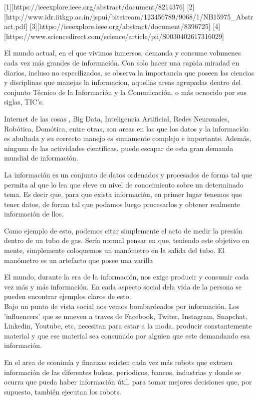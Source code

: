 [1][https://ieeexplore.ieee.org/abstract/document/8214376]
[2][http://www.idr.iitkgp.ac.in/jspui/bitstream/123456789/9068/1/NB15975_Abstract.pdf]
[3][https://ieeexplore.ieee.org/abstract/document/8396725]
[4][https://www.sciencedirect.com/science/article/pii/S0030402617316029]




El mundo actual, en el que vivimos inmersos, demanda y consume volumenes cada vez más grandes de información. Con solo hacer una rapida miradad en diarios, incluso no especilizados, se observa la importancia que poseen las ciencias y disciplinas que manejas la informacion, aquellas areas agrupadas dentro del conjunto Técnico de la Información y la Comunicación, o más ocnocido por sus siglas, TIC's.

Internet de las cosas , Big Data, Inteligencia Artificial, Redes Neuronales, Robótica, Domótica, entre otras, son areas en las que los datos y la información es abultada y su correcto manejo es sumamente complejo e importante. Además, ninguna de las actividades científicas, puede escapar de esta gran demanda mundial de información.

La información es un conjunto de datos ordenados y procesados de forma tal que permita al que lo lea que eleve su nivel de conocimiento sobre un determinado tema. Es decir que, para que exista información, en primer lugar tenemos que tener datos, de forma tal que podamos luego procesarlos y obtener realmente información de llos.

Como ejemplo de esto, podemos citar simplemente el acto de medir la presión dentro de un tubo de gas. Sería normal pensar en que, teniendo este objetivo en mente, simplemente coloquemos un manómetro en la salida del tubo. El manómetro es un artefacto que posee una varilla 





El mundo, durante la era de la información, nos exige producir y consumir cada vez más y más información. En cada aspecto social dela vida de la persona se pueden encontrar ejemplos claros de esto.\\

Bajo un punto de vista social nos vemos bombardeados por información. Los 'influencers' que se mueven a traves de Facebook, Twiter, Instagram, Snapchat, Linkedin, Youtube, etc, necesitan para estar a la moda, producir constantemente material y que ese material sea consumido por alguien que este demandando esa información.

En el area de econimía y finanzas existen cada vez más robots que extraen información de las diferentes bolsas, periodicos, bancos, industrias y donde se ocurra que pueda haber información útil, para tomar mejores decisiones que, por supuesto, también ejecutan los robots.

